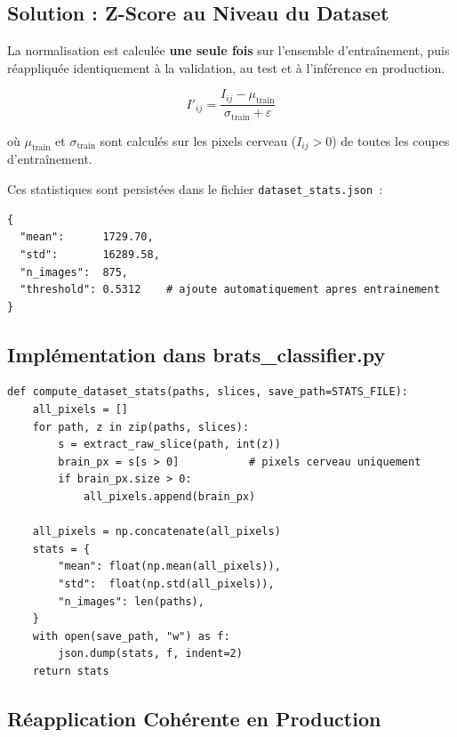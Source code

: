 \documentclass[12pt, a4paper]{report}
\newcommand{\fichier}[1]{\texttt{\small\color{blue!70!black}#1}}
\begin{document}
\subsection{Solution : Z-Score au Niveau du Dataset}

La normalisation est calculée \textbf{une seule fois} sur l'ensemble
d'entraînement, puis réappliquée identiquement à la validation, au
test et à l'inférence en production.

\begin{equation}
  \label{eq:zscore}
  I'_{ij} = \frac{I_{ij} - \mu_{\text{train}}}{\sigma_{\text{train}} + \varepsilon}
\end{equation}

où \(\mu_{\text{train}}\) et \(\sigma_{\text{train}}\) sont calculés
sur les pixels cerveau (\(I_{ij} > 0\)) de toutes les coupes
d'entraînement.

Ces statistiques sont persistées dans le fichier
\fichier{dataset\_stats.json}~:

\begin{lstlisting}[caption={Contenu de dataset\_stats.json},
                   label={lst:stats_json}]
{
  "mean":      1729.70,
  "std":       16289.58,
  "n_images":  875,
  "threshold": 0.5312    # ajoute automatiquement apres entrainement
}
\end{lstlisting}

\subsection{Implémentation dans brats\_classifier.py}

\begin{lstlisting}[caption={Calcul des statistiques dataset (brats\_classifier.py)},
                   label={lst:compute_stats}]
def compute_dataset_stats(paths, slices, save_path=STATS_FILE):
    all_pixels = []
    for path, z in zip(paths, slices):
        s = extract_raw_slice(path, int(z))
        brain_px = s[s > 0]           # pixels cerveau uniquement
        if brain_px.size > 0:
            all_pixels.append(brain_px)

    all_pixels = np.concatenate(all_pixels)
    stats = {
        "mean": float(np.mean(all_pixels)),
        "std":  float(np.std(all_pixels)),
        "n_images": len(paths),
    }
    with open(save_path, "w") as f:
        json.dump(stats, f, indent=2)
    return stats
\end{lstlisting}

\subsection{Réapplication Cohérente en Production}
\end{document}

